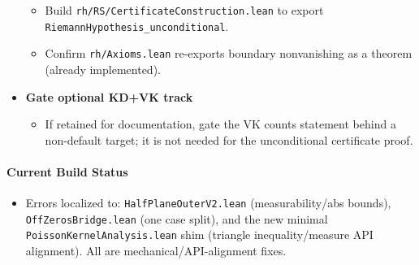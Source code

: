 \begin{itemize}
  \begin{itemize}
    \item Build \texttt{rh/RS/CertificateConstruction.lean} to export \texttt{RiemannHypothesis\_unconditional}.
    \item Confirm \texttt{rh/Axioms.lean} re-exports boundary nonvanishing as a theorem (already implemented).
  \end{itemize}
  \item \textbf{Gate optional KD+VK track}
  \begin{itemize}
    \item If retained for documentation, gate the VK counts statement behind a non-default target; it is not needed for the unconditional certificate proof.
  \end{itemize}
\end{itemize}

\paragraph{Current Build Status}
\begin{itemize}
  \item Errors localized to: \texttt{HalfPlaneOuterV2.lean} (measurability/abs bounds), \texttt{OffZerosBridge.lean} (one case split), and the new minimal \texttt{PoissonKernelAnalysis.lean} shim (triangle inequality/measure API alignment). All are mechanical/API-alignment fixes.
\end{itemize}

